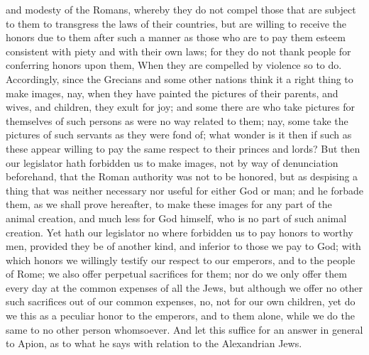 and modesty of the Romans, whereby they do not compel those that are
subject to them to transgress the laws of their countries, but are willing
to receive the honors due to them after such a manner as those who are to
pay them esteem consistent with piety and with their own laws; for they do
not thank people for conferring honors upon them, When they are compelled
by violence so to do. Accordingly, since the Grecians and some other
nations think it a right thing to make images, nay, when they have painted
the pictures of their parents, and wives, and children, they exult for
joy; and some there are who take pictures for themselves of such persons
as were no way related to them; nay, some take the pictures of such
servants as they were fond of; what wonder is it then if such as these
appear willing to pay the same respect to their princes and lords? But
then our legislator hath forbidden us to make images, not by way of
denunciation beforehand, that the Roman authority was not to be honored,
but as despising a thing that was neither necessary nor useful for either
God or man; and he forbade them, as we shall prove hereafter, to make
these images for any part of the animal creation, and much less for God
himself, who is no part of such animal creation. Yet hath our legislator
no where forbidden us to pay honors to worthy men, provided they be of
another kind, and inferior to those we pay to God; with which honors we
willingly testify our respect to our emperors, and to the people of Rome;
we also offer perpetual sacrifices for them; nor do we only offer them
every day at the common expenses of all the Jews, but although we offer no
other such sacrifices out of our common expenses, no, not for our own
children, yet do we this as a peculiar honor to the emperors, and to them
alone, while we do the same to no other person whomsoever. And let this
suffice for an answer in general to Apion, as to what he says with
relation to the Alexandrian Jews.

